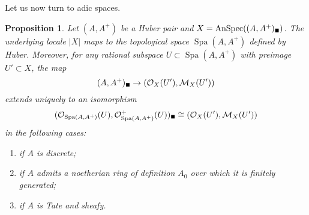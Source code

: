 \documentclass[11pt]{amsbook}
\DeclareMathOperator{\Spa}{Spa}
\DeclareMathOperator{\AnSpec}{AnSpec}
\newcommand{\solid}{{\mathsmaller{\blacksquare}}}
\numberwithin{equation}{section}
\numberwithin{theorem}{section}
\newtheorem{proposition}[theorem]{Proposition}
\theoremstyle{definition}
\begin{document}
Let us now turn to adic spaces.

\begin{proposition} Let $(A,A^+)$ be a Huber pair and $X=\AnSpec((A,A^+)_\solid)$. The underlying locale $|X|$ maps to the topological space $\Spa(A,A^+)$ defined by Huber. Moreover, for any rational subspace $U\subset \Spa(A,A^+)$ with preimage $U'\subset X$, the map
\[
(A,A^+)_\solid\to (\mathcal O_X(U'),\mathcal M_X(U'))
\]
extends uniquely to an isomorphism
\[
(\mathcal O_{\Spa(A,A^+)}(U),\mathcal O_{\Spa(A,A^+)}^+(U))_\solid\cong (\mathcal O_X(U'),\mathcal M_X(U'))
\]
in the following cases:
\begin{enumerate}
\item if $A$ is discrete;
\item if $A$ admits a noetherian ring of definition $A_0$ over which it is finitely generated;
\item if $A$ is Tate and sheafy.
\end{enumerate}
\end{proposition}
\end{document}
